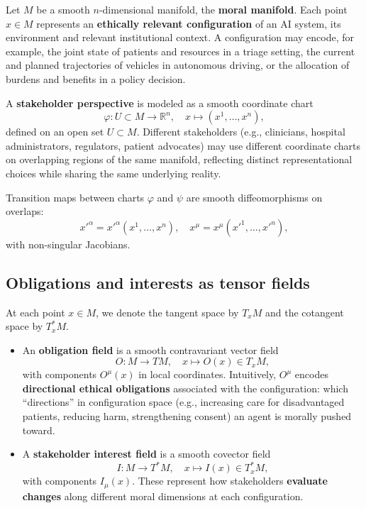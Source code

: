 \documentclass[12pt]{article}
\theoremstyle{remark}
\begin{document}
Let $M$ be a smooth $n$-dimensional manifold, the \textbf{moral manifold}. Each point $x \in M$ represents an \textbf{ethically relevant configuration} of an AI system, its environment and relevant institutional context. A configuration may encode, for example, the joint state of patients and resources in a triage setting, the current and planned trajectories of vehicles in autonomous driving, or the allocation of burdens and benefits in a policy decision.

A \textbf{stakeholder perspective} is modeled as a smooth coordinate chart
\begin{equation}
    \varphi\colon U \subset M \to \mathbb{R}^n,\quad x \mapsto (x^1, \dots, x^n),
\end{equation}
defined on an open set $U \subset M$. Different stakeholders (e.g., clinicians, hospital administrators, regulators, patient advocates) may use different coordinate charts on overlapping regions of the same manifold, reflecting distinct representational choices while sharing the same underlying reality.

Transition maps between charts $\varphi$ and $\psi$ are smooth diffeomorphisms on overlaps:
\begin{equation}
    x'^{\alpha} = x'^{\alpha}(x^1, \dots, x^n),\quad x^{\mu} = x^{\mu}(x'^{1}, \dots, x'^{n}),
\end{equation}
with non-singular Jacobians.

\subsection{Obligations and interests as tensor fields}

At each point $x \in M$, we denote the tangent space by $T_x M$ and the cotangent space by $T_x^* M$.

\begin{itemize}
    \item An \textbf{obligation field} is a smooth contravariant vector field
    \begin{equation}
        O\colon M \to TM,\quad x \mapsto O(x) \in T_x M,
    \end{equation}
    with components $O^\mu(x)$ in local coordinates. Intuitively, $O^\mu$ encodes \textbf{directional ethical obligations} associated with the configuration: which ``directions'' in configuration space (e.g., increasing care for disadvantaged patients, reducing harm, strengthening consent) an agent is morally pushed toward.

    \item A \textbf{stakeholder interest field} is a smooth covector field
    \begin{equation}
        I\colon M \to T^* M,\quad x \mapsto I(x) \in T_x^* M,
    \end{equation}
    with components $I_\mu(x)$. These represent how stakeholders \textbf{evaluate changes} along different moral dimensions at each configuration.
\end{itemize}
\end{document}
